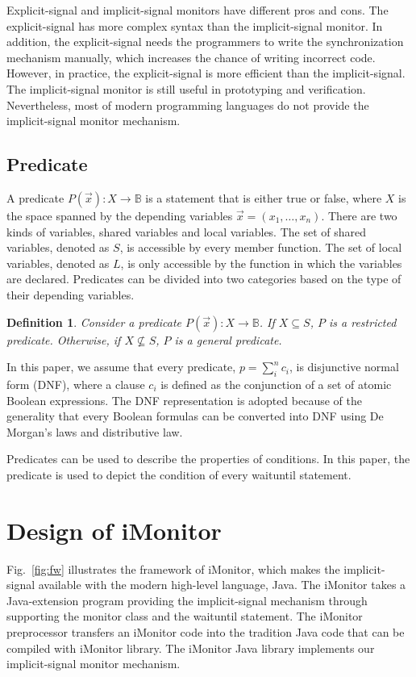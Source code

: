 \documentclass[preprint]{sigplanconf}
\newtheorem{definition}{Definition}
\begin{document}
Explicit-signal and implicit-signal monitors have different pros and cons. The 
explicit-signal has more complex syntax than the implicit-signal monitor. In 
addition, the explicit-signal needs the programmers to write the synchronization
mechanism manually, which increases the chance of writing incorrect code. 
However, in practice, the explicit-signal is more efficient than the implicit-signal. 
The implicit-signal monitor is still useful in prototyping and verification. 
Nevertheless, most of modern programming languages do not provide the 
implicit-signal monitor mechanism.

\subsection{Predicate}
A predicate $P(\vec{x}): X \rightarrow \mathbb{B}$ is a statement that is 
either true or false, where $X$ is the space spanned by the depending variables 
$\vec{x}=(x_1, \dots, x_n)$. There are two kinds of
variables, shared variables and local variables. The set of shared variables, 
denoted as $S$, is accessible by every member function. The set of local 
variables, denoted as $L$, is only accessible by the function in which the
variables are declared. 
Predicates can be divided into two categories based on the type of their 
depending variables.
\begin{definition}
    Consider a predicate $P(\vec{x}): X \rightarrow \mathbb{B}$. If $X 
    \subseteq S$, $P$ 
    is a restricted predicate. Otherwise, if $X \not\subseteq S$, $P$ 
    is a general predicate. 
\end{definition}

In this paper, we assume that every predicate, $p = \sum_i^nc_i$, is disjunctive 
normal form (DNF), where a clause $c_i$ is defined as the conjunction of a set
of atomic Boolean expressions. The DNF representation is adopted because of the
generality that every Boolean formulas can be converted into DNF using De
Morgan's laws and distributive law. 


Predicates can be used to describe the properties of conditions. In this paper,
the predicate is used to depict the condition of every waituntil statement. 




\section{Design of iMonitor} \label{sec:fw}
Fig.~\ref{fig:fw} illustrates the framework of iMonitor, which makes 
the implicit-signal available with the modern high-level language, Java. 
The iMonitor takes a Java-extension program providing the implicit-signal 
mechanism through supporting the monitor class and the waituntil statement. The 
iMonitor preprocessor transfers an iMonitor code into the tradition Java code 
that can be compiled with iMonitor library. The iMonitor 
Java library implements our implicit-signal monitor mechanism.  
\end{document}
